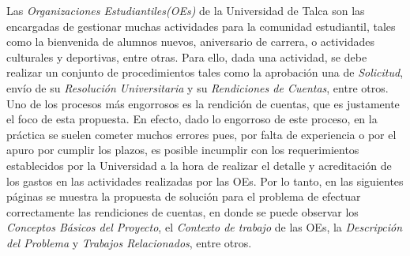 Las \emph{Organizaciones Estudiantiles(OEs)} de la Universidad de Talca son las encargadas de gestionar muchas actividades para la comunidad estudiantil, tales como la bienvenida de alumnos nuevos, aniversario de carrera, o actividades culturales y deportivas, entre otras. Para ello, dada una actividad, se debe realizar un conjunto de procedimientos tales como la aprobación una de \emph{Solicitud}, envío de su \emph{Resolución Universitaria} y su \emph{Rendiciones de Cuentas}, entre otros. Uno de los procesos más engorrosos es la rendición de cuentas, que es justamente el foco de esta propuesta. En efecto, dado lo engorroso de este proceso, en la práctica se suelen cometer muchos errores pues, por falta de experiencia o por el apuro por cumplir los plazos, es posible incumplir con los requerimientos establecidos por la Universidad a la hora de realizar el detalle y acreditación de los gastos en las actividades realizadas por las OEs. Por lo tanto, en las siguientes páginas se muestra la propuesta de solución para el problema de efectuar correctamente las rendiciones de cuentas, en donde se puede observar los \emph{Conceptos Básicos del Proyecto}, el \emph{Contexto de trabajo} de las OEs, la \emph{Descripción del Problema} y \emph{Trabajos Relacionados}, entre otros.